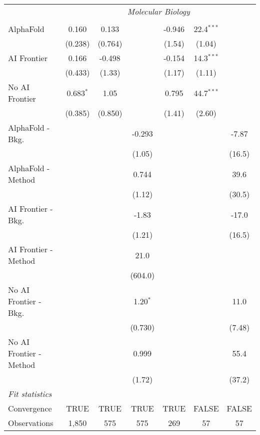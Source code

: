 \begin{tabular}{lcccccc}
 & \multicolumn{6}{c}{\textit{Molecular Biology}} \\ \\
   AlphaFold               & 0.160       & 0.133   &            & -0.946 & 22.4$^{***}$ &   \\   
                           & (0.238)     & (0.764) &            & (1.54) & (1.04)       &   \\   
   AI Frontier             & 0.166       & -0.498  &            & -0.154 & 14.3$^{***}$ &   \\   
                           & (0.433)     & (1.33)  &            & (1.17) & (1.11)       &   \\   
   No AI Frontier          & 0.683$^{*}$ & 1.05    &            & 0.795  & 44.7$^{***}$ &   \\   
                           & (0.385)     & (0.850) &            & (1.41) & (2.60)       &   \\   
   AlphaFold - Bkg.        &             &         & -0.293     &        &              & -7.87\\   
                           &             &         & (1.05)     &        &              & (16.5)\\   
   AlphaFold - Method      &             &         & 0.744      &        &              & 39.6\\   
                           &             &         & (1.12)     &        &              & (30.5)\\   
   AI Frontier - Bkg.      &             &         & -1.83      &        &              & -17.0\\   
                           &             &         & (1.21)     &        &              & (16.5)\\   
   AI Frontier - Method    &             &         & 21.0       &        &              &   \\   
                           &             &         & (604.0)    &        &              &   \\   
   No AI Frontier - Bkg.   &             &         & 1.20$^{*}$ &        &              & 11.0\\   
                           &             &         & (0.730)    &        &              & (7.48)\\   
   No AI Frontier - Method &             &         & 0.999      &        &              & 55.4\\   
                           &             &         & (1.72)     &        &              & (37.2)\\   
   \midrule
   \emph{Fit statistics}\\
   Convergence             &TRUE         & TRUE    & TRUE       & TRUE   & FALSE        & FALSE\\  
   Observations            & 1,850       & 575     & 575        & 269    & 57           & 57\\  
   

\end{tabular}

